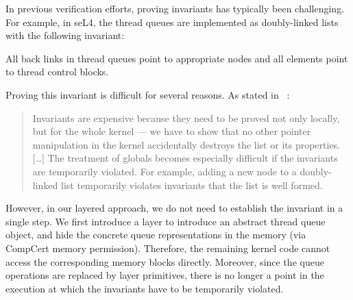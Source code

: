 In previous verification efforts,
proving invariants has typically been challenging.
For example, in seL4, the thread queues are implemented as doubly-linked lists with 
the following invariant:
\begin{invariant}
\label{inv:spec:queue}
 All back links in thread queues point to appropriate nodes and all elements point
 to thread control blocks.
\end{invariant}
Proving this invariant is difficult
for several reasons.
As stated in ~\cite{klein2009sel4}:
\begin{quote}
  Invariants are expensive because
  they need to be proved not only locally,
  but for the whole kernel ---
  we have to show that no other pointer manipulation in the kernel
  accidentally destroys the list or its properties.
  [\ldots]
  The treatment of globals becomes especially difficult
  if the invariants are temporarily violated.
  For example,
  adding a new node to a doubly-linked list
  temporarily violates invariants that the list is well formed.
\end{quote}
However, in our layered approach,
we do not need to establish the invariant in a single step.
We first introduce a layer to introduce
an abstract thread queue object,
and hide the concrete queue representations
in the memory (via CompCert memory permission).
Therefore, the remaining kernel code cannot access
the corresponding memory blocks directly.
Moreover, since the queue operations 
are replaced by  layer primitives,
there is no longer a point in the execution
at which the invariants have to be temporarily violated.
